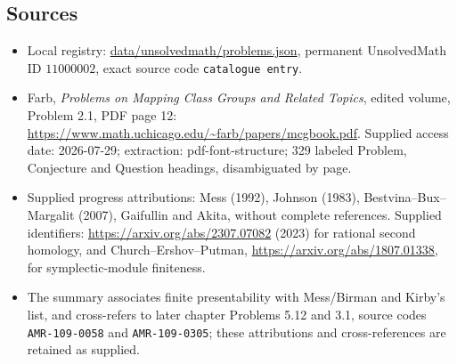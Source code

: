 \documentclass[11pt]{article}
\begin{document}
\subsection{Sources}
\begin{itemize}
\item Local registry: \url{data/unsolvedmath/problems.json}, permanent UnsolvedMath ID $11000002$, exact source code \texttt{catalogue entry}.
\item Farb, \emph{Problems on Mapping Class Groups and Related Topics}, edited volume, Problem 2.1, PDF page 12: \url{https://www.math.uchicago.edu/~farb/papers/mcgbook.pdf}. Supplied access date: 2026-07-29; extraction: pdf-font-structure; 329 labeled Problem, Conjecture and Question headings, disambiguated by page.
\item Supplied progress attributions: Mess (1992), Johnson (1983), Bestvina--Bux--Margalit (2007), Gaifullin and Akita, without complete references. Supplied identifiers: \url{https://arxiv.org/abs/2307.07082} (2023) for rational second homology, and Church--Ershov--Putman, \url{https://arxiv.org/abs/1807.01338}, for symplectic-module finiteness.
\item The summary associates finite presentability with Mess/Birman and Kirby's list, and cross-refers to later chapter Problems 5.12 and 3.1, source codes \texttt{AMR-109-0058} and \texttt{AMR-109-0305}; these attributions and cross-references are retained as supplied.
\end{itemize}
\end{document}
